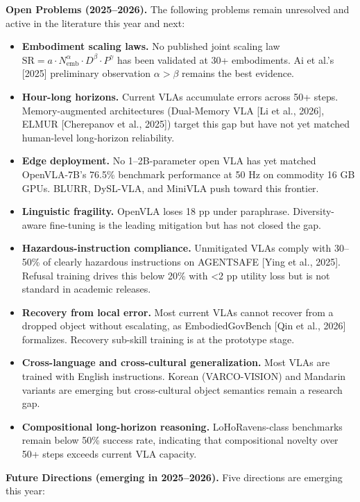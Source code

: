 \textbf{Open Problems (2025--2026).} The following problems remain unresolved and active in the literature this year and next:

\begin{itemize}
\tightlist
\item
  \textbf{Embodiment scaling laws.} No published joint scaling law \(\text{SR} = a \cdot N_{\text{emb}}^{\alpha} \cdot D^{\beta} \cdot P^{\gamma}\) has been validated at 30+ embodiments. Ai et al.'s {[}2025{]} preliminary observation \(\alpha > \beta\) remains the best evidence.
\item
  \textbf{Hour-long horizons.} Current VLAs accumulate errors across 50+ steps. Memory-augmented architectures (Dual-Memory VLA {[}Li et al., 2026{]}, ELMUR {[}Cherepanov et al., 2025{]}) target this gap but have not yet matched human-level long-horizon reliability.
\item
  \textbf{Edge deployment.} No 1--2B-parameter open VLA has yet matched OpenVLA-7B's 76.5\% benchmark performance at 50 Hz on commodity 16 GB GPUs. BLURR, DySL-VLA, and MiniVLA push toward this frontier.
\item
  \textbf{Linguistic fragility.} OpenVLA loses 18 pp under paraphrase. Diversity-aware fine-tuning is the leading mitigation but has not closed the gap.
\item
  \textbf{Hazardous-instruction compliance.} Unmitigated VLAs comply with 30--50\% of clearly hazardous instructions on AGENTSAFE {[}Ying et al., 2025{]}. Refusal training drives this below 20\% with \textless2 pp utility loss but is not standard in academic releases.
\item
  \textbf{Recovery from local error.} Most current VLAs cannot recover from a dropped object without escalating, as EmbodiedGovBench {[}Qin et al., 2026{]} formalizes. Recovery sub-skill training is at the prototype stage.
\item
  \textbf{Cross-language and cross-cultural generalization.} Most VLAs are trained with English instructions. Korean (VARCO-VISION) and Mandarin variants are emerging but cross-cultural object semantics remain a research gap.
\item
  \textbf{Compositional long-horizon reasoning.} LoHoRavens-class benchmarks remain below 50\% success rate, indicating that compositional novelty over 50+ steps exceeds current VLA capacity.
\end{itemize}

\textbf{Future Directions (emerging in 2025--2026).} Five directions are emerging this year:

